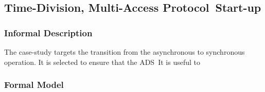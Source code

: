 \subsection{Time-Division, Multi-Access Protocol\ Start-up}\label{sec:tdma}


\subsubsection{Informal Description}

The case-study targets the transition from the asynchronous to synchronous operation. It is selected to ensure that the ADS\ It is useful to  
\subsubsection{Formal Model}
